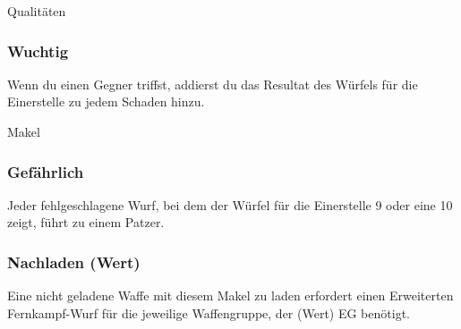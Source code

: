 \documentclass{article}
\begin{document}
\begin{multicols*}{3}
\begin{slsframe}{Qualitäten}
        \subsubsection*{Wuchtig}
        Wenn du einen Gegner triffst, addierst du das Resultat des Würfels für die Einerstelle zu jedem Schaden hinzu.

    \end{slsframe}

    \begin{slsframe}{Makel}
        \subsubsection*{Gefährlich}
        Jeder fehlgeschlagene Wurf, bei dem der Würfel für die Einerstelle 9 oder eine 10 zeigt, führt zu einem Patzer.

        \subsubsection*{Nachladen (Wert)}
        Eine nicht geladene Waffe mit diesem Makel zu laden erfordert einen Erweiterten Fernkampf-Wurf für die jeweilige Waffengruppe, der (Wert) EG benötigt.

    \end{slsframe}





\end{multicols*}
\end{document}
